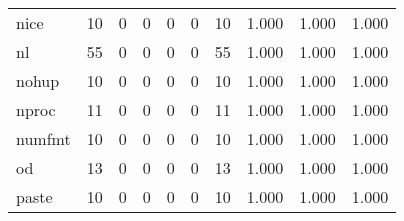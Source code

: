 \begin{longtable}{lp{2.0cm}p{2.0cm}p{2.0cm}p{2.0cm}p{2.0cm}p{2.0cm}p{2.0cm}p{2.0cm}p{2.0cm}}
nice      &                     10 &                                             0 &                                            0 &                                           0 &                                            0 &                                         10 &                                1.000 &                                  1.000 &                                1.000 \\
nl        &                     55 &                                             0 &                                            0 &                                           0 &                                            0 &                                         55 &                                1.000 &                                  1.000 &                                1.000 \\
nohup     &                     10 &                                             0 &                                            0 &                                           0 &                                            0 &                                         10 &                                1.000 &                                  1.000 &                                1.000 \\
nproc     &                     11 &                                             0 &                                            0 &                                           0 &                                            0 &                                         11 &                                1.000 &                                  1.000 &                                1.000 \\
numfmt    &                     10 &                                             0 &                                            0 &                                           0 &                                            0 &                                         10 &                                1.000 &                                  1.000 &                                1.000 \\
od        &                     13 &                                             0 &                                            0 &                                           0 &                                            0 &                                         13 &                                1.000 &                                  1.000 &                                1.000 \\
paste     &                     10 &                                             0 &                                            0 &                                           0 &                                            0 &                                         10 &                                1.000 &                                  1.000 &                                1.000 \\

\end{longtable}
